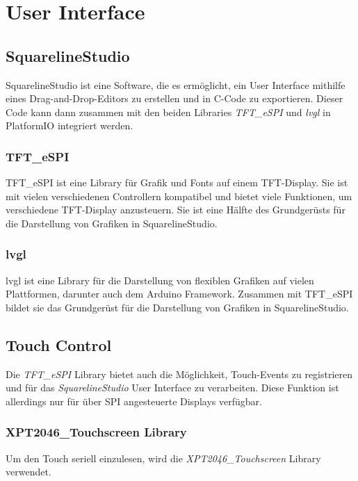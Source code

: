\section{User Interface}
        \subsection{SquarelineStudio}
        SquarelineStudio ist eine Software, die es ermöglicht, ein 
        User Interface mithilfe eines Drag-and-Drop-Editors zu erstellen und
        in C-Code zu exportieren. Dieser Code kann dann zusammen mit den 
        beiden Libraries \textit{TFT\_eSPI} und \textit{lvgl} in PlatformIO
        integriert werden.

            \subsubsection{TFT\_eSPI}
            TFT\_eSPI ist eine Library für Grafik und Fonts auf einem TFT-Display.
            Sie ist mit vielen verschiedenen Controllern kompatibel und bietet
            viele Funktionen, um verschiedene TFT-Display anzusteuern.
            Sie ist eine Hälfte des Grundgerüsts für die Darstellung von Grafiken 
            in SquarelineStudio.

            \subsubsection{lvgl}
            lvgl ist eine Library für die Darstellung von flexiblen Grafiken
            auf vielen Plattformen, darunter auch dem Arduino Framework.
            Zusammen mit TFT\_eSPI bildet sie das Grundgerüst für die Darstellung
            von Grafiken in SquarelineStudio.
        \subsection{Touch Control}
        Die \textit{TFT\_eSPI} Library bietet auch die Möglichkeit, Touch-Events
        zu registrieren und für das \textit{SquarelineStudio} User Interface zu
        verarbeiten. Diese Funktion ist allerdings nur für über SPI angesteuerte
        Displays verfügbar.
            \subsubsection{XPT2046\_Touchscreen Library}
            Um den Touch seriell einzulesen, wird die \textit{XPT2046\_Touchscreen}
            Library verwendet. 

